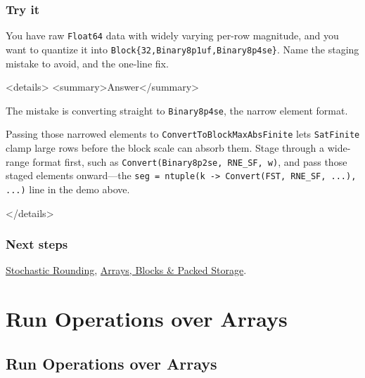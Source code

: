 \subsection{Try it}



\label{14108577375059315810}{}


You have raw \texttt{Float64} data with widely varying per-row magnitude, and you want to quantize it into \texttt{Block\{32,Binary8p1uf,Binary8p4se\}}. Name the staging mistake to avoid, and the one-line fix.



<details> <summary>Answer</summary>



The mistake is converting straight to \texttt{Binary8p4se}, the narrow element format.



Passing those narrowed elements to \texttt{ConvertToBlockMaxAbsFinite} lets \texttt{SatFinite} clamp large rows before the block scale can absorb them. Stage through a wide-range format first, such as \texttt{Convert(\allowbreak{}Binary8p2se, RNE\_\allowbreak{}SF, w)}, and pass those staged elements onward—the \texttt{seg = ntuple(\allowbreak{}k -> Convert(\allowbreak{}FST, RNE\_\allowbreak{}SF, ...), ...)} line in the demo above.



</details>



\subsection{Next steps}



\label{3807517405601295309-dup2}{}


\href{workflow\_\allowbreak{}stochastic.md}{Stochastic Rounding}, \href{reference\_\allowbreak{}arrays\_\allowbreak{}blocks\_\allowbreak{}storage.md}{Arrays, Blocks \& Packed Storage}.



\chapter{Run Operations over Arrays}


\section{Run Operations over Arrays}



